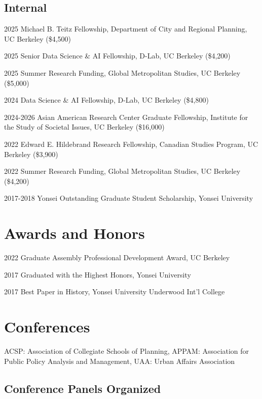 \documentclass[11pt,letterpaper]{report}
\begin{document}
\subsection*{Internal}
\begin{tablist}
\item[2025] \tab{}Michael B. Teitz Fellowship, Department of City and Regional Planning, UC Berkeley (\$4,500)
\item[2025] \tab{}Senior Data Science \& AI Fellowship, D-Lab, UC Berkeley (\$4,200)
\item[2025] \tab{}Summer Research Funding, Global Metropolitan Studies, UC Berkeley (\$5,000)
\item[2024] \tab{}Data Science \& AI Fellowship, D-Lab, UC Berkeley (\$4,800)
\item[2024-2026] \tab{}Asian American Research Center Graduate Fellowship, Institute for the Study of Societal Issues, UC Berkeley (\$16,000)
\item[2022] \tab{}Edward E. Hildebrand Research Fellowship, Canadian Studies Program, UC Berkeley (\$3,900)
\item[2022] \tab{}Summer Research Funding, Global Metropolitan Studies, UC Berkeley (\$4,200)
\item[2017-2018] \tab{}Yonsei Outstanding Graduate Student Scholarship, Yonsei University
\end{tablist}

\section*{Awards and Honors}
\begin{tablist}
\item[2022] \tab{}Graduate Assembly Professional Development Award, UC Berkeley
\item[2017] \tab{}Graduated with the Highest Honors, Yonsei University
\item[2017] \tab{}Best Paper in History, Yonsei University Underwood Int'l College
\end{tablist}

\section*{Conferences}
ACSP: Association of Collegiate Schools of Planning, APPAM: Association for Public Policy Analysis and Management, UAA: Urban Affairs Association

\subsection*{Conference Panels Organized}
\end{document}
